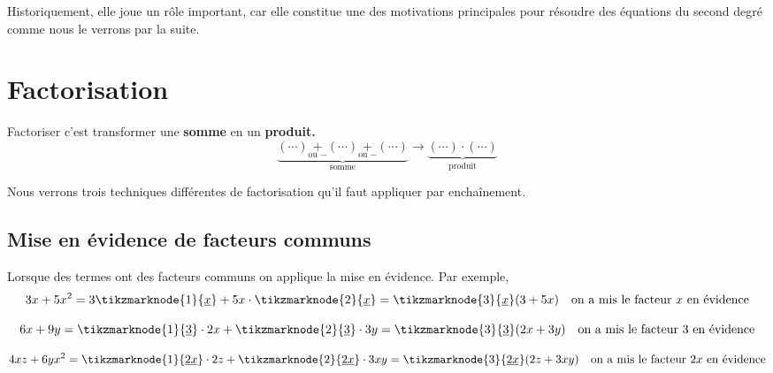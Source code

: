 \documentclass[a4paper,12pt]{report}
\begin{document}
Historiquement, elle joue un rôle important, car elle constitue une des motivations principales pour résoudre des équations du second degré comme nous le verrons par la suite. 

\section{Factorisation}
\begin{center}
Factoriser c'est transformer une {\bfseries somme} en un {\bfseries produit.}
\[\underbrace{(\cdots)\underset{\text{ou } -}{+}(\cdots)\underset{\text{ou } -}{+}(\cdots)}_{\text{ somme }}\longrightarrow \underbrace{(\cdots)\cdot (\cdots)}_{\text{produit}}\]
\end{center}

Nous verrons trois techniques différentes de factorisation qu'il faut appliquer par enchaînement. 
\subsection{Mise en évidence de facteurs communs}
Lorsque des termes ont des facteurs communs on applique la mise en évidence. Par exemple, 
\[3x+5x^2=3\tikzmarknode{1}{\uline{x}}+5x\cdot \tikzmarknode{2}{\uline{x}}= \tikzmarknode{3}{\uline{x}}(3+5x) \quad \text{on a mis le facteur } x \text{ en évidence}\]
\[6x+9y=\tikzmarknode{1}{\uline{3}}\cdot 2 x + \tikzmarknode{2}{\uline{3}}\cdot 3y= \tikzmarknode{3}{\uline{3}}(2x+3y)\quad \text{on a mis le facteur } 3 \text{ en évidence}
\]
\[
	4xz+6yx^2=\tikzmarknode{1}{\uline{2x}}\cdot 2 z + \tikzmarknode{2}{\uline{2x}}\cdot 3xy= \tikzmarknode{3}{\uline{2x}}(2z+3xy)\quad \text{on a mis le facteur } 2x \text{ en évidence}
\]
\end{document}
